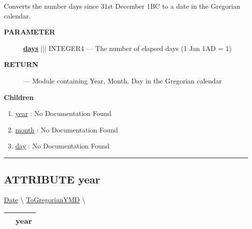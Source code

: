 \par





Converts the number days since 31st December 1BC to a date in the Gregorian calendar.






\par
\begin{description}
\item [\colorbox{tagtype}{\color{white} \textbf{\textsf{PARAMETER}}}] \textbf{\underline{days}} ||| INTEGER4 --- The number of elapsed days (1 Jan 1AD = 1)
\end{description}







\par
\begin{description}
\item [\colorbox{tagtype}{\color{white} \textbf{\textsf{RETURN}}}] \textbf{} --- Module containing Year, Month, Day in the Gregorian calendar
\end{description}




\textbf{Children}
\begin{enumerate}
\item \hyperlink{ecldoc:date.togregorianymd.result.year}{year}
: No Documentation Found
\item \hyperlink{ecldoc:date.togregorianymd.result.month}{month}
: No Documentation Found
\item \hyperlink{ecldoc:date.togregorianymd.result.day}{day}
: No Documentation Found
\end{enumerate}

\rule{\linewidth}{0.5pt}

\subsection*{\textsf{\colorbox{headtoc}{\color{white} ATTRIBUTE}
year}}

\hypertarget{ecldoc:date.togregorianymd.result.year}{}
\hspace{0pt} \hyperlink{ecldoc:Date}{Date} \textbackslash 
\hspace{0pt} \hyperlink{ecldoc:date.togregorianymd}{ToGregorianYMD} \textbackslash 

{\renewcommand{\arraystretch}{1.5}
\begin{tabularx}{\textwidth}{|>{\raggedright\arraybackslash}l|X|}
\hline
\hspace{0pt}\mytexttt{\color{red} } & \textbf{year} \\
\hline
\end{tabularx}
}

